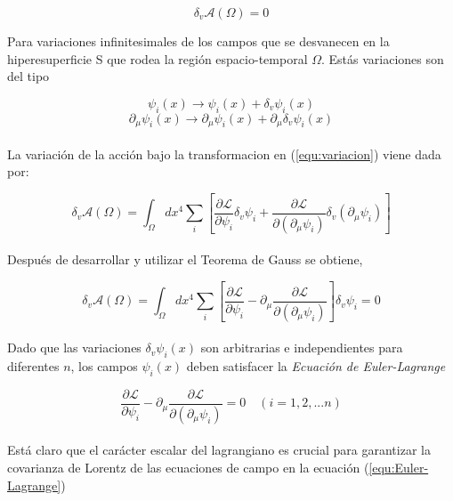 \documentclass[12pt]{article}
\begin{document}
\begin{equation}
  \delta_v \mathcal{A}(\Omega)=0  
\end{equation}

Para variaciones infinitesimales de los campos que se desvanecen en la hiperesuperficie S que rodea la región espacio-temporal $\Omega$. Estás variaciones son del tipo

\[ \psi_i(x) \rightarrow \psi_i(x) + \delta_v  \psi_i(x) \]
\begin{equation}
\partial_\mu\psi_i(x) \rightarrow \partial_\mu\psi_i(x) + \partial_\mu \delta_v  \psi_i(x)
\label{equ:variacion}
\end{equation} \\

La variación de la acción bajo la transformacion en (\ref{equ:variacion}) viene dada por: 

%
\begin{equation}
  \delta_v \mathcal{A}(\Omega)=  \int_\Omega dx^4  \sum_{i}\left[\frac{\partial\mathcal{L}}{\partial\psi_i}\delta_v\psi_i + \frac{\partial\mathcal{L}}{\partial(\partial_\mu\psi_i)}\delta_v(\partial_\mu\psi_i)\right] 
\end{equation} \\

Después de desarrollar y utilizar el Teorema de Gauss se obtiene,

\begin{equation}
    \delta_v \mathcal{A}(\Omega)= \int_\Omega dx^4  \sum_{i}\left[\frac{\partial\mathcal{L}}{\partial\psi_i} - \partial_\mu  \frac{\partial\mathcal{L}}{\partial(\partial_\mu\psi_i)}\right]\delta_v\psi_i   =0
\end{equation} \\ 

Dado que las variaciones $\delta_v  \psi_i(x)$ son arbitrarias e independientes para diferentes $ n $, los campos $\psi_i(x)$ deben satisfacer la \textit{Ecuación de Euler-Lagrange } 
 
 \begin{equation}
\frac{\partial\mathcal{L}}{\partial\psi_i} - \partial_\mu  \frac{\partial\mathcal{L}}{\partial(\partial_\mu\psi_i)}=0 \quad (i=1,2,...n)
\label{equ:Euler-Lagrange}
 \end{equation} \\


 Está claro que el carácter escalar del lagrangiano es crucial para garantizar la covarianza de Lorentz de las ecuaciones de campo en la ecuación (\ref{equ:Euler-Lagrange})
 
\end{document}
